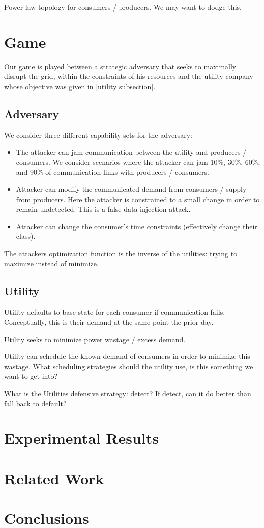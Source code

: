\documentclass[conference]{IEEEtran}
\begin{document}
Power-law topology for consumers / producers.  We may want to dodge this.

\section{Game}

Our game is played between a strategic adversary that seeks to maximally disrupt the grid, within the constraints of his
resources and the utility company whose objective was given in [utility subsection].  

\subsection{Adversary}

We consider three different capability sets for the adversary:

\begin{itemize}
\item The attacker can jam communication between the utility and producers / consumers.  We consider scenarios where the
attacker can jam 10\%, 30\%, 60\%, and 90\% of communication links with producers / consumers.
\item Attacker can modify the communicated demand from consumers / supply from producers.  Here the attacker is constrained
to a small change in order to remain undetected. This is a false data injection attack.
\item  Attacker can change the consumer's time constraints (effectively change their class).
\end{itemize}

The attackers optimization function is the inverse of the utilities: trying to maximize instead of minimize.

\subsection{Utility}

Utility defaults to base state for each consumer if communication fails.  Conceptually, this is their demand at the same 
point the prior day.

Utility seeks to minimize power wastage / excess demand.

Utility can schedule the known demand of consumers in order to minimize this wastage.  What scheduling strategies
should the utility use, is this something we want to get into?

What is the Utilities defensive strategy: detect? If detect, can it do better than fall back to default?

\section{Experimental Results}
\section{Related Work}
\section{Conclusions}
\end{document}
